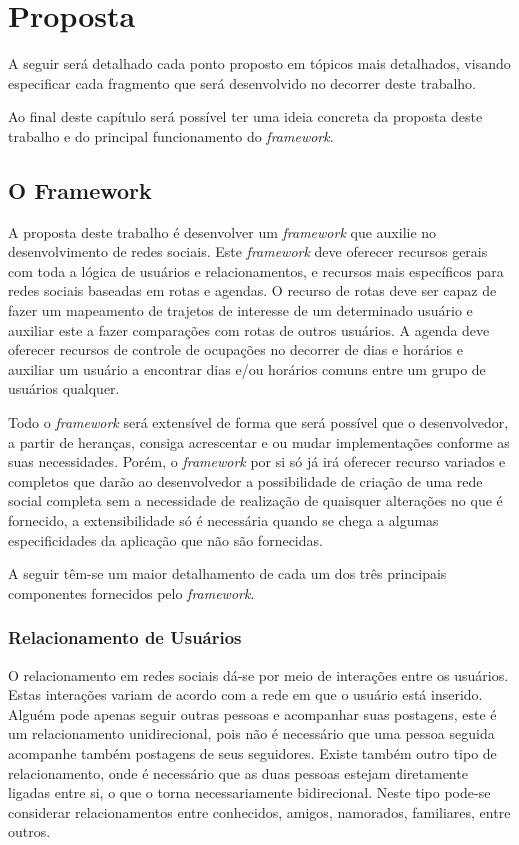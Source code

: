 \chapter{Proposta}
\label{chapter:Proposta}

A seguir será detalhado cada ponto proposto em tópicos mais detalhados, visando especificar cada fragmento que será desenvolvido no decorrer deste trabalho.

Ao final deste capítulo será possível ter uma ideia concreta da proposta deste trabalho e do principal funcionamento do \textit{framework}.

\section{O Framework}

A proposta deste trabalho é desenvolver um \textit{framework} que auxilie no desenvolvimento de redes sociais. Este \textit{framework} deve oferecer recursos gerais com toda a lógica de usuários e relacionamentos, e recursos mais específicos para redes sociais baseadas em rotas e agendas. O recurso de rotas deve ser capaz de fazer um mapeamento de trajetos de interesse de um determinado usuário e auxiliar este a fazer comparações com rotas de outros usuários. A agenda deve oferecer recursos de controle de ocupações no decorrer de dias e horários e auxiliar um usuário a encontrar dias e/ou horários comuns entre um grupo de usuários qualquer.

Todo o \textit{framework} será extensível de forma que será possível que o desenvolvedor, a partir de heranças, consiga acrescentar e ou mudar implementações conforme as suas necessidades. Porém, o \textit{framework} por si só já irá oferecer recurso variados e completos que darão ao desenvolvedor a possibilidade de criação de uma rede social completa sem a necessidade de realização de quaisquer alterações no que é fornecido, a extensibilidade só é necessária quando se chega a algumas especificidades da aplicação que não são fornecidas.

A seguir têm-se um maior detalhamento de cada um dos três principais componentes fornecidos pelo \textit{framework}.

\subsection{Relacionamento de Usuários}

O relacionamento em redes sociais dá-se por meio de interações entre os usuários. Estas interações variam de acordo com a rede em que o usuário está inserido. Alguém pode apenas seguir outras pessoas e acompanhar suas postagens, este é um relacionamento unidirecional, pois não é necessário que uma pessoa seguida acompanhe também postagens de seus seguidores. Existe também outro tipo de relacionamento, onde é necessário que as duas pessoas estejam diretamente ligadas entre si, o que o torna necessariamente bidirecional. Neste tipo pode-se considerar relacionamentos entre conhecidos, amigos, namorados, familiares, entre outros.

